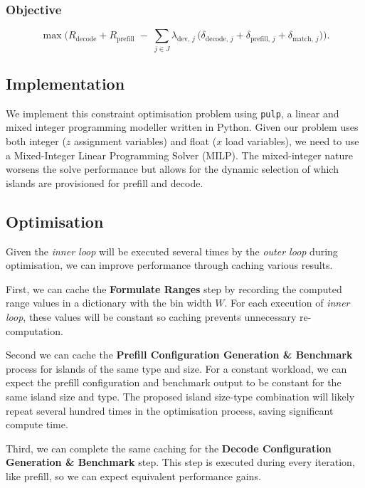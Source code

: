 \subsubsection*{Objective}
\[
\max \Biggl(
  R_{\mathrm{decode}} + R_{\mathrm{prefill}}
  \;-\; \sum_{j\in J} \lambda_{\mathrm{dev},\,j}\,\bigl(\delta_{\mathrm{decode},\,j} + \delta_{\mathrm{prefill},\,j} + \delta_{\mathrm{match},\,j}\bigr)
\Biggr).
\]

\clearpage
\subsection{Implementation}

We implement this constraint optimisation problem using \texttt{pulp}, a linear and mixed integer programming modeller written in Python.
Given our problem uses both integer ($z$ assignment variables) and float ($x$ load variables), we need to use a Mixed-Integer Linear Programming Solver (MILP).
The mixed-integer nature worsens the solve performance but allows for the dynamic selection of which islands are provisioned for prefill and decode.


\subsection{Optimisation}

Given the \textit{inner loop} will be executed several times by the \textit{outer loop} during optimisation, we can improve performance through caching various results.

First, we can cache the \textbf{Formulate Ranges} step by recording the computed range values in a dictionary with the bin width $W$.
For each execution of \textit{inner loop}, these values will be constant so caching prevents unnecessary re-computation.

Second we can cache the \textbf{Prefill Configuration Generation \& Benchmark} process for islands of the same type and size.
For a constant workload, we can expect the prefill configuration and benchmark output to be constant for the same island size and type.
The proposed island size-type combination will likely repeat several hundred times in the optimisation process, saving significant compute time.

Third, we can complete the same caching for the \textbf{Decode Configuration Generation \& Benchmark} step.
This step is executed during every iteration, like prefill, so we can expect equivalent performance gains.

